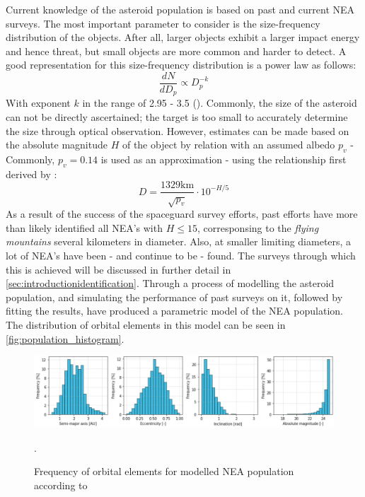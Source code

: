 Current knowledge of the asteroid population is based on past and current NEA surveys. The most important parameter to consider is the size-frequency distribution of the objects. After all, larger objects exhibit a larger impact energy and hence threat, but small objects are more common and harder to detect. A good representation for this size-frequency distribution is a power law as follows:
\begin{equation}
 \frac{dN}{dD_p} \propto D_p^{-k}
 \label{eq:sizefreqlaw}
\end{equation}
With exponent $k$ in the range of 2.95 - 3.5 (\cite{AsteroidSizeFrequency}). Commonly, the size of the asteroid can not be directly ascertained; the target is too small to accurately determine the size through optical observation. However, estimates can be made based on the absolute magnitude $H$ of the object by relation with an assumed albedo $p_v$ - Commonly, $p_v = 0.14$ is used as an approximation - using the relationship first derived by \cite{AsteroidSizeAlbedo}:
\begin{equation}
 D = \frac{1329 \mathrm{km}}{\sqrt{p_v}}\cdot 10^{-H/5}
 \label{eq:asteroidsize}
\end{equation}
As a result of the success of the spaceguard survey efforts, past efforts have more than likely identified all NEA's with $H \leq 15$, corresponsing to the \textit{flying mountains} several kilometers in diameter. Also, at smaller limiting diameters, a lot of NEA's have been - and continue to be - found. The surveys through which this is achieved will be discussed in further detail in \autoref{sec:introductionidentification}. Through a process of modelling the asteroid population, and simulating the performance of past surveys on it, followed by fitting the results, \cite{GranvikPopulation} have produced a parametric model of the NEA population. The distribution of orbital elements in this model can be seen in \autoref{fig:population_histogram}. \\

\begin{figure}[htbp]
 \centering
 \includegraphics[width=1.0\textwidth]{img/population_histogram.png}
 \caption{Frequency of orbital elements for modelled NEA population according to \cite{GranvikPopulation}}.
 \label{fig:population_histogram}
\end{figure}


